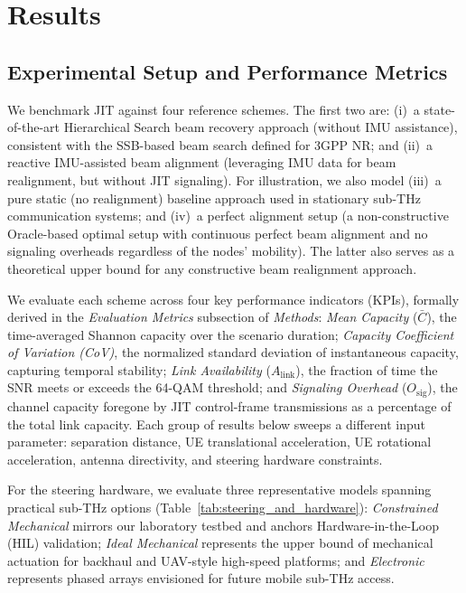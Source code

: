 \documentclass[fleqn,10pt]{wlscirep}
\newcommand{\rev}[1]{{\color{revblue}#1}}
\begin{document}
\section*{Results}

\rev{\subsection*{Experimental Setup and Performance Metrics}}

We benchmark JIT against four reference schemes. The first two are: (i)~a \rev{state-of-the-art Hierarchical Search beam recovery approach (without IMU assistance)\cite{photonics11060540}, consistent with the SSB-based beam search defined for 3GPP NR\cite{Giordani2018ATO, Heng2021SixChallenges}}; and (ii)~a reactive IMU-assisted beam alignment (leveraging IMU data for beam realignment, but without JIT signaling)\rev{\cite{s141019622, Brambilla_2019, 9391649}}. For illustration, we also model (iii)~a pure static (no realignment) baseline approach used in stationary sub-THz communication systems; and (iv)~a perfect alignment setup (a non-constructive Oracle-based optimal setup with continuous perfect beam alignment and no signaling overheads regardless of the nodes' mobility). The latter also serves as a theoretical upper bound for any constructive beam realignment approach.

\rev{We evaluate each scheme across four key performance indicators (KPIs), formally derived in the \textit{Evaluation Metrics} subsection of \textit{Methods}: \emph{Mean Capacity} ($\bar{C}$), the time-averaged Shannon capacity over the scenario duration; \emph{Capacity Coefficient of Variation (CoV)}, the normalized standard deviation of instantaneous capacity, capturing temporal stability; \emph{Link Availability} ($A_{\text{link}}$), the fraction of time the SNR meets or exceeds the 64-QAM threshold; and \emph{Signaling Overhead} ($O_{\text{sig}}$), the channel capacity foregone by JIT control-frame transmissions as a percentage of the total link capacity. Each group of results below sweeps a different input parameter: separation distance, UE translational acceleration, UE rotational acceleration, antenna directivity, and steering hardware constraints.}

\rev{For the steering hardware, we evaluate three representative models spanning practical sub-THz options (Table~\ref{tab:steering_and_hardware}): \textit{Constrained Mechanical} mirrors our laboratory testbed and anchors Hardware-in-the-Loop (HIL) validation; \textit{Ideal Mechanical} represents the upper bound of mechanical actuation for backhaul and UAV-style high-speed platforms; and \textit{Electronic} represents phased arrays envisioned for future mobile sub-THz access.}
\end{document}
